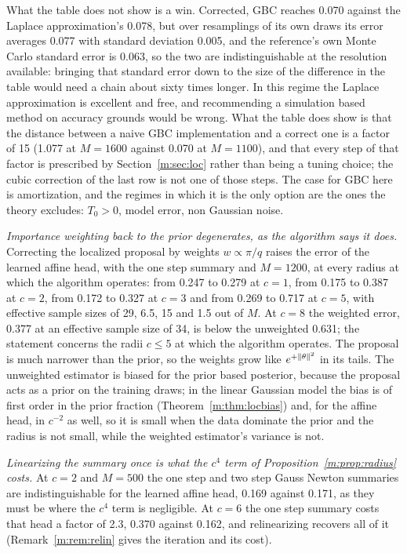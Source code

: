 What the table does not show is a win. Corrected, GBC reaches 0.070 against the Laplace approximation's 0.078, but over resamplings of its own draws its error averages 0.077 with standard deviation 0.005, and the reference's own Monte Carlo standard error is 0.063, so the two are indistinguishable at the resolution available: bringing that standard error down to the size of the difference in the table would need a chain about sixty times longer. In this regime the Laplace approximation is excellent and free, and recommending a simulation based method on accuracy grounds would be wrong. What the table does show is that the distance between a naive GBC implementation and a correct one is a factor of 15 (1.077 at $M=1600$ against 0.070 at $M=1100$), and that every step of that factor is prescribed by Section~\ref{m:sec:loc} rather than being a tuning choice; the cubic correction of the last row is not one of those steps. The case for GBC here is amortization, and the regimes in which it is the only option are the ones the theory excludes: $T_0>0$, model error, non Gaussian noise.

\begin{remark}\label{m:rem:nsdiag}
\emph{Importance weighting back to the prior degenerates, as the algorithm says it does.} Correcting the localized proposal by weights $w\propto\pi/q$ raises the error of the learned affine head, with the one step summary and $M=1200$, at every radius at which the algorithm operates: from 0.247 to 0.279 at $c=1$, from 0.175 to 0.387 at $c=2$, from 0.172 to 0.327 at $c=3$ and from 0.269 to 0.717 at $c=5$, with effective sample sizes of 29, 6.5, 15 and 1.5 out of $M$. At $c=8$ the weighted error, 0.377 at an effective sample size of 34, is below the unweighted 0.631; the statement concerns the radii $c\le5$ at which the algorithm operates. The proposal is much narrower than the prior, so the weights grow like $e^{+\left\|\theta\right\|^2}$ in its tails. The unweighted estimator is biased for the prior based posterior, because the proposal acts as a prior on the training draws; in the linear Gaussian model the bias is of first order in the prior fraction (Theorem~\ref{m:thm:locbias}) and, for the affine head, in $c^{-2}$ as well, so it is small when the data dominate the prior and the radius is not small, while the weighted estimator's variance is not.

\emph{Linearizing the summary once is what the $c^4$ term of Proposition~\ref{m:prop:radius} costs.} At $c=2$ and $M=500$ the one step and two step Gauss Newton summaries are indistinguishable for the learned affine head, 0.169 against 0.171, as they must be where the $c^4$ term is negligible. At $c=6$ the one step summary costs that head a factor of 2.3, 0.370 against 0.162, and relinearizing recovers all of it (Remark~\ref{m:rem:relin} gives the iteration and its cost).
\end{remark}

